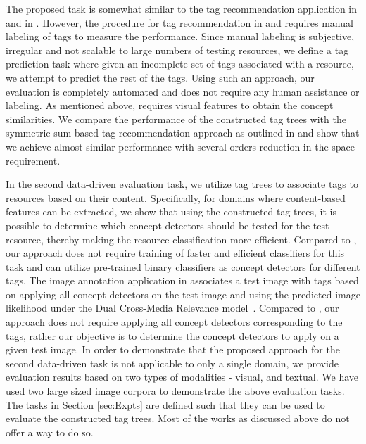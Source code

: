 {The proposed task is somewhat similar to the tag recommendation application in  {\cite{katsurai2013cross}} and in {\cite{sigurbjornsson2008flickr}}. However, the procedure for tag recommendation in {\cite{katsurai2013cross}} and  {\cite{sigurbjornsson2008flickr}} requires manual labeling of tags to measure the performance. Since manual labeling is subjective, irregular and not scalable to large numbers of testing resources, we define a tag prediction task where given an incomplete set of tags associated with a resource, we attempt to predict the rest of the tags. Using such an approach, our evaluation is completely automated and does not require any human assistance or labeling. As mentioned above, {\cite{katsurai2013cross}} requires visual features to obtain the concept similarities. We compare the performance of the constructed tag trees with the symmetric sum based tag recommendation approach as outlined in {\cite{sigurbjornsson2008flickr}} and show that we achieve almost similar performance with several orders reduction in the space requirement.  

\indent In the second data-driven evaluation task, we utilize tag trees to associate tags to resources based on their content. Specifically, for domains where content-based features can be extracted, we show that using the constructed tag trees, it is possible to determine which concept detectors should be tested for the test resource, thereby making the resource classification more efficient. Compared to {\cite{li2013classifying}}, our approach does not require training of faster and efficient classifiers for this task and can utilize pre-trained binary classifiers as concept detectors for different tags. The image annotation application in {\cite{wu2008flickr}} associates a test image with tags based on applying all concept detectors on the test image and using the predicted image likelihood under the Dual Cross-Media Relevance model~{\cite{liu2007dual}}. Compared to {\cite{wu2008flickr}}, our approach does not require applying all concept detectors corresponding to the tags, rather our objective is to determine the concept detectors to apply on a given test image. In order to demonstrate that the proposed approach for the second data-driven task is not applicable to only a single domain, we provide evaluation results based on two types of modalities - visual, and textual. We have used two large sized image corpora to demonstrate the above evaluation tasks. 
The tasks in Section {\ref{sec:Expts}} are defined such that they can be used to evaluate the constructed tag trees. Most of the works as discussed above do not offer a way to do so. 


}
